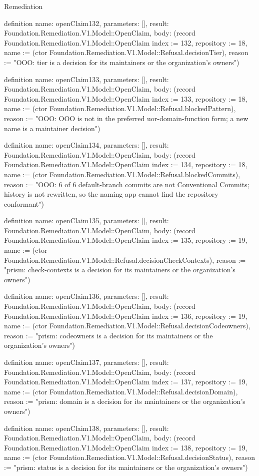 \begin{lexlean}{Remediation}
\begin{semanticmodule}
definition{
  name: openClaim132,
  parameters: [],
  result: Foundation.Remediation.V1.Model::OpenClaim,
  body: (record Foundation.Remediation.V1.Model::OpenClaim {index := 132, repository := 18, name := (ctor Foundation.Remediation.V1.Model::Refusal.decisionTier), reason := "OOO: tier is a decision for its maintainers or the organization's owners"})
}

definition{
  name: openClaim133,
  parameters: [],
  result: Foundation.Remediation.V1.Model::OpenClaim,
  body: (record Foundation.Remediation.V1.Model::OpenClaim {index := 133, repository := 18, name := (ctor Foundation.Remediation.V1.Model::Refusal.blockedPattern), reason := "OOO: OOO is not in the preferred uor-{domain}-{function} form; a new name is a maintainer decision"})
}

definition{
  name: openClaim134,
  parameters: [],
  result: Foundation.Remediation.V1.Model::OpenClaim,
  body: (record Foundation.Remediation.V1.Model::OpenClaim {index := 134, repository := 18, name := (ctor Foundation.Remediation.V1.Model::Refusal.blockedCommits), reason := "OOO: 6 of 6 default-branch commits are not Conventional Commits; history is not rewritten, so the naming app cannot find the repository conformant"})
}

definition{
  name: openClaim135,
  parameters: [],
  result: Foundation.Remediation.V1.Model::OpenClaim,
  body: (record Foundation.Remediation.V1.Model::OpenClaim {index := 135, repository := 19, name := (ctor Foundation.Remediation.V1.Model::Refusal.decisionCheckContexts), reason := "prism: check-contexts is a decision for its maintainers or the organization's owners"})
}

definition{
  name: openClaim136,
  parameters: [],
  result: Foundation.Remediation.V1.Model::OpenClaim,
  body: (record Foundation.Remediation.V1.Model::OpenClaim {index := 136, repository := 19, name := (ctor Foundation.Remediation.V1.Model::Refusal.decisionCodeowners), reason := "prism: codeowners is a decision for its maintainers or the organization's owners"})
}

definition{
  name: openClaim137,
  parameters: [],
  result: Foundation.Remediation.V1.Model::OpenClaim,
  body: (record Foundation.Remediation.V1.Model::OpenClaim {index := 137, repository := 19, name := (ctor Foundation.Remediation.V1.Model::Refusal.decisionDomain), reason := "prism: domain is a decision for its maintainers or the organization's owners"})
}

definition{
  name: openClaim138,
  parameters: [],
  result: Foundation.Remediation.V1.Model::OpenClaim,
  body: (record Foundation.Remediation.V1.Model::OpenClaim {index := 138, repository := 19, name := (ctor Foundation.Remediation.V1.Model::Refusal.decisionStatus), reason := "prism: status is a decision for its maintainers or the organization's owners"})
}


\end{semanticmodule}
\end{lexlean}
